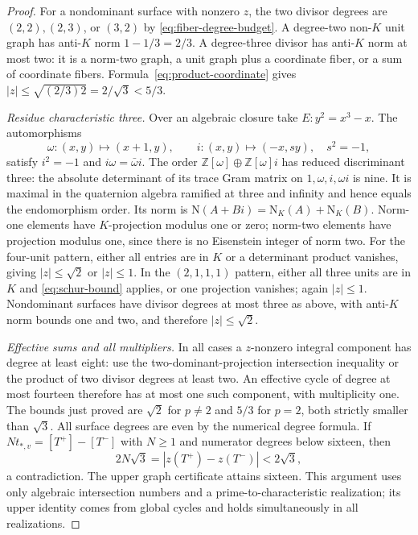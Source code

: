 \begin{proof}
For a nondominant surface with nonzero $z$, the two divisor degrees are $(2,2),(2,3)$, or $(3,2)$ by \eqref{eq:fiber-degree-budget}.  A degree-two non-$K$ unit graph has anti-$K$ norm $1-1/3=2/3$.  A degree-three divisor has anti-$K$ norm at most two: it is a norm-two graph, a unit graph plus a coordinate fiber, or a sum of coordinate fibers.  Formula~\eqref{eq:product-coordinate} gives $|z|\leq\sqrt{(2/3)2}=2/\sqrt3<5/3$.

\emph{Residue characteristic three.}
Over an algebraic closure take $E:y^2=x^3-x$.  The automorphisms
\[
 \omega:(x,y)\longmapsto(x+1,y),\qquad
 i:(x,y)\longmapsto(-x,s y),\quad s^2=-1,
\]
satisfy $i^2=-1$ and $i\omega=\bar\omega i$.  The order
$\mathbb Z[\omega]\oplus\mathbb Z[\omega]i$ has reduced discriminant three: the absolute determinant of its trace Gram matrix on $1,\omega,i,\omega i$ is nine.  It is maximal in the quaternion algebra ramified at three and infinity and hence equals the endomorphism order.  Its norm is
$\mathrm N(A+Bi)=\mathrm N_K(A)+\mathrm N_K(B)$.
Norm-one elements have $K$-projection modulus one or zero; norm-two elements have projection modulus one, since there is no Eisenstein integer of norm two.
For the four-unit pattern, either all entries are in $K$ or a determinant product vanishes, giving $|z|\leq\sqrt2$ or $|z|\leq1$.  In the $(2,1,1,1)$ pattern, either all three units are in $K$ and \eqref{eq:schur-bound} applies, or one projection vanishes; again $|z|\leq1$.  Nondominant surfaces have divisor degrees at most three as above, with anti-$K$ norm bounds one and two, and therefore $|z|\leq\sqrt2$.

\emph{Effective sums and all multipliers.}
In all cases a $z$-nonzero integral component has degree at least eight: use the two-dominant-projection intersection inequality or the product of two divisor degrees at least two.  An effective cycle of degree at most fourteen therefore has at most one such component, with multiplicity one.  The bounds just proved are $\sqrt2$ for $p\ne2$ and $5/3$ for $p=2$, both strictly smaller than $\sqrt3$.  All surface degrees are even by the numerical degree formula.  If $Nt_{*,v}=[T^+]-[T^-]$ with $N\geq1$ and numerator degrees below sixteen, then
\[
 2N\sqrt3=|z(T^+)-z(T^-)|<2\sqrt3,
\]
a contradiction.  The upper graph certificate attains sixteen.  This argument uses only algebraic intersection numbers and a prime-to-characteristic realization; its upper identity comes from global cycles and holds simultaneously in all realizations.
\end{proof}

